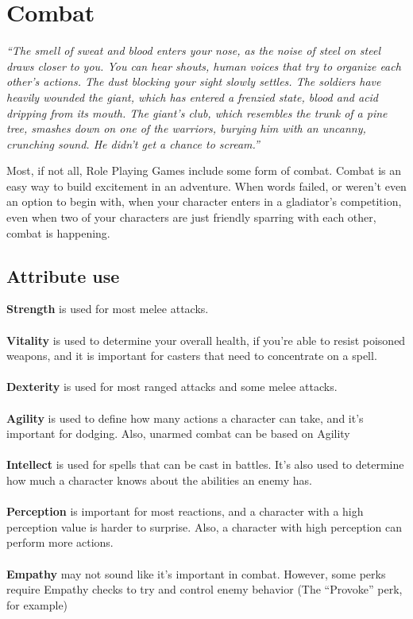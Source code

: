 \chapter{Combat}
\textit{“The smell of sweat and blood enters your nose, as the noise of steel on steel draws closer to you. You can hear shouts, human voices that try to organize each other’s actions. The dust blocking your sight slowly settles. The soldiers have heavily wounded the giant, which has entered a frenzied state, blood and acid dripping from its mouth. The giant’s club, which resembles the trunk of a pine tree, smashes down on one of the warriors, burying him with an uncanny, crunching sound. He didn’t get a chance to scream.”}


Most, if not all, Role Playing Games include some form of combat. Combat is an easy way to build excitement in an adventure. When words failed, or weren’t even an option to begin with, when your character enters in a gladiator’s competition, even when two of your characters are just friendly sparring with each other, combat is happening.


\section{Attribute use}

\textbf{Strength} is used for most melee attacks.\\~\\
\textbf{Vitality} is used to determine your overall health, if you’re able to resist poisoned weapons, and it is important for casters that need to concentrate on a spell.\\~\\
\textbf{Dexterity} is used for most ranged attacks and some melee attacks.\\~\\
\textbf{Agility} is used to define how many actions a character can take, and it’s important for dodging. Also, unarmed combat can be based on Agility\\~\\
\textbf{Intellect} is used for spells that can be cast in battles. It’s also used to determine how much a character knows about the abilities an enemy has.\\~\\
\textbf{Perception} is important for most reactions, and a character with a high perception value is harder to surprise. Also, a character with high perception can perform more actions.\\~\\
\textbf{Empathy} may not sound like it’s important in combat. However, some perks require Empathy checks to try and control enemy behavior (The “Provoke” perk, for example)

